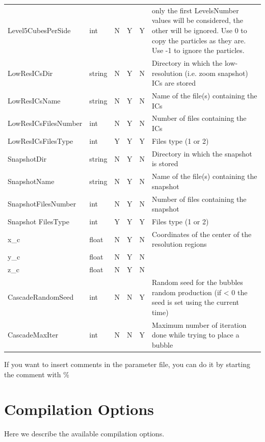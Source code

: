 \documentclass[11pt,a4paper,titlepage]{article}
\begin{document}
\begin{longtable}{l|l|c|c|c|p{4.3cm}}
Level5CubesPerSide         &  int         & N & Y & Y & only the first LevelsNumber values will be considered, the other will be ignored. Use 0 to copy the particles as they are. Use -1 to ignore the particles. \\
LowResICsDir               &  string      & N & Y & N &  Directory in which the low-resolution (i.e. zoom snapshot) ICs are stored \\
LowResICsName              &  string      & N & Y & N &  Name of the file(s) containing the ICs \\
LowResICsFilesNumber       &  int         & N & Y & N &  Number of files containing the ICs \\
LowResICsFilesType         &  int         & Y & Y & Y &  Files type (1 or 2) \\
SnapshotDir                &  string      & N & Y & N &  Directory in which the snapshot is stored \\
SnapshotName               &  string      & N & Y & N &  Name of the file(s) containing the snapshot \\
SnapshotFilesNumber        &  int         & N & Y & N &  Number of files containing the snapshot \\
Snapshot  FilesType        &  int         & Y & Y & Y &  Files type (1 or 2) \\
x\_c                       &  float       & N & Y & N &  Coordinates of the center of the resolution regions \\
y\_c                       &  float       & N & Y & N & \\
z\_c                       &  float       & N & Y & N & \\
CascadeRandomSeed          &  int         & N & N & Y &  Random seed for the bubbles random production (if < 0 the seed is set using the current time)\\
CascadeMaxIter             &  int         & N & N & Y &  Maximum number of iteration done while trying to place a bubble\\

\hline

\end{longtable}

If you want to insert comments in the parameter file, you can do it by starting the comment with \%

\section{Compilation Options}
Here we describe the available compilation options.
\end{document}

